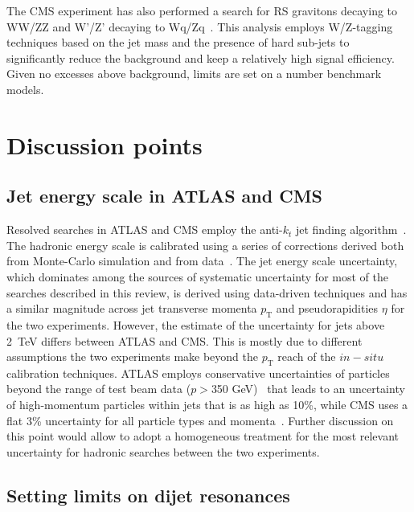 \documentclass{PoS}
\newcommand{\antikt}{anti-$k_t$}
\begin{document}
The CMS experiment has also performed a search for RS gravitons decaying to 
WW/ZZ and W'/Z' decaying to Wq/Zq~\cite{Chatrchyan:2012ypy}. This analysis employs 
W/Z-tagging techniques based on the jet mass and the presence
of hard sub-jets to significantly reduce the background and keep a relatively high signal efficiency. 
Given no excesses above background, limits are set on a number benchmark models. 

\section{Discussion points}

\subsection{Jet energy scale in ATLAS and CMS}

Resolved searches in ATLAS and CMS employ the \antikt{} jet finding algorithm~\cite{Cacciari:2008gp}.
The hadronic energy scale is calibrated using a series of corrections 
derived both from Monte-Carlo simulation and from 
data~\cite{ATLAS-CONF-2013-004, 1748-0221-6-11-P11002, Aad:2011he}. 
The jet energy scale uncertainty, which dominates among the sources of systematic 
uncertainty for most of the searches described in this review, is derived using data-driven 
techniques and has a similar magnitude across
jet transverse momenta $p_\mathrm{T}$ and pseudorapidities $\eta$ for the two experiments. 
However, 
the estimate of the uncertainty for jets above 2~TeV differs between ATLAS and CMS. 
This is mostly due to different assumptions the two experiments make beyond the
$p_\mathrm{T}$ reach of the $in-situ$ calibration techniques. ATLAS employs conservative
uncertainties of particles beyond the range of test beam data ($p>$350 GeV)~
\cite{Aad:2012vm} that leads to an uncertainty of high-momentum particles within jets that is as high as 10\%, 
while CMS uses a flat 3\% uncertainty for all particle types and momenta~\cite{CMS-PAS-JME-10-008}. 
Further discussion on this point would allow to adopt a homogeneous treatment for 
the most relevant uncertainty for hadronic searches between the two experiments. 

\subsection{Setting limits on dijet resonances}
\end{document}
